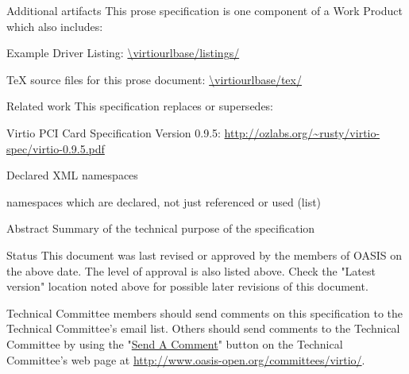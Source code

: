 \begin{titlepage}
\begin{oasistitlesection}{Additional artifacts}
This prose specification is one component of a Work Product which also includes:
\begin{itemize*}
	\item Example Driver Listing: \newline
	\url{\virtiourlbase/listings/}
	\item TeX source files for this prose document:\newline
	\url{\virtiourlbase/tex/}
\end{itemize*}
\end{oasistitlesection}
\vspace{-0.2in}

\begin{oasistitlesection}{Related work}
This specification replaces or supersedes:
\begin{itemize*}
	\item Virtio PCI Card Specification Version 0.9.5:\newline
	\url{http://ozlabs.org/~rusty/virtio-spec/virtio-0.9.5.pdf}
\end{itemize*}
\end{oasistitlesection}
\vspace{-0.2in}

\begin{oasistitlesection}{Declared XML namespaces}
\vspace{-0.1in}
\begin{itemize*}
	\item namespaces which are declared, not just referenced or used (list)
\end{itemize*}
\end{oasistitlesection}

\begin{oasistitlesection}{Abstract}
Summary of the technical purpose of the specification
\end{oasistitlesection}

\begin{oasistitlesection}{Status}
This document was last revised or approved by the members of OASIS on the above date. The level of approval is also listed above. Check the "Latest version" location noted above for possible later revisions of this document.

Technical Committee members should send comments on this specification to the Technical Committee’s email list. Others should send comments to the Technical Committee by using the "\href{http://www.oasis-open.org/committees/comments/form.php?wg_abbrev=virtio}{Send A Comment}" button on the Technical Committee’s web page at \url{http://www.oasis-open.org/committees/virtio/}.


\end{oasistitlesection}
\end{titlepage}
